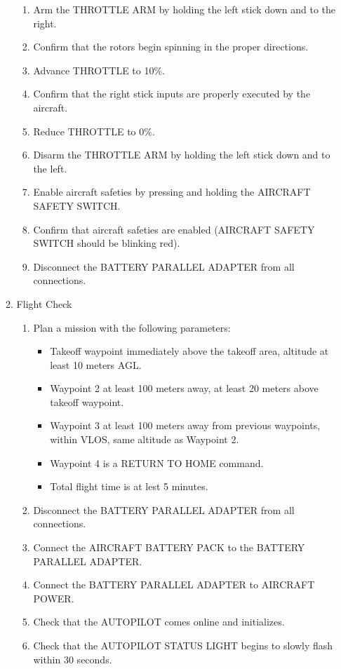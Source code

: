 \documentclass{report}
\begin{document}
\begin{enumerate}
\begin{enumerate}
\begin{enumerate}
							\item Arm the THROTTLE ARM by holding the left stick down and to the right.
							\item Confirm that the rotors begin spinning in the proper directions.
							\item Advance THROTTLE to 10\%.
							\item Confirm that the right stick inputs are properly executed by the aircraft.
							\item Reduce THROTTLE to 0\%.
							\item Disarm the THROTTLE ARM by holding the left stick down and to the left.
							\item Enable aircraft safeties by pressing and holding the AIRCRAFT SAFETY SWITCH.
							\item Confirm that aircraft safeties are enabled (AIRCRAFT SAFETY SWITCH should be blinking red).
							\item Disconnect the BATTERY PARALLEL ADAPTER from all connections.
						\end{enumerate}
					\item Flight Check
						\begin{enumerate}
							\item Plan a mission with the following parameters:
								\begin{itemize}
									\item Takeoff waypoint immediately above the takeoff area, altitude at least 10 meters AGL.
									\item Waypoint 2 at least 100 meters away, at least 20 meters above takeoff waypoint.
									\item Waypoint 3 at least 100 meters away from previous waypoints, within VLOS, same altitude as Waypoint 2.
									\item Waypoint 4 is a RETURN TO HOME command.
									\item Total flight time is at lest 5 minutes.
								\end{itemize}
							\item Disconnect the BATTERY PARALLEL ADAPTER from all connections.
							\item Connect the AIRCRAFT BATTERY PACK to the BATTERY PARALLEL ADAPTER.
							\item Connect the BATTERY PARALLEL ADAPTER to AIRCRAFT POWER.
							\item Check that the AUTOPILOT comes online and initializes.
							\item Check that the AUTOPILOT STATUS LIGHT begins to slowly flash within 30 seconds.

\end{enumerate}
\end{enumerate}
\end{enumerate}
\end{document}
